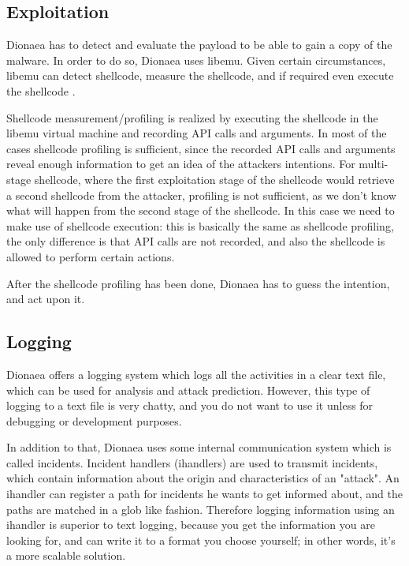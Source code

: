 \documentclass[epsfig,a4paper,11pt,titlepage,oneside,openany]{book}
\begin{document}
\begin{itemize}
\subsection{Exploitation}

Dionaea has to detect and evaluate the payload to be able to gain a copy of the malware. In order to do so, Dionaea uses libemu. Given certain circumstances, libemu can detect shellcode, measure the shellcode, and if required even execute the shellcode \cite{dionaea}.

Shellcode measurement/profiling is realized by executing the shellcode in the libemu virtual machine and recording API calls and arguments. In most of the cases shellcode profiling is sufficient, since the recorded API calls and arguments reveal enough information to get an idea of the attackers intentions. For multi-stage shellcode, where the first exploitation stage of the shellcode would retrieve a second shellcode from the attacker, profiling is not sufficient, as we don’t know what will happen from the second stage of the shellcode. In this case we need to make use of shellcode execution: this is basically the same as shellcode profiling, the only difference is that API calls are not recorded, and also the shellcode is allowed to perform certain actions.

After the shellcode profiling has been done, Dionaea has to guess the intention, and act upon it.

\subsection{Logging}

Dionaea offers a logging system which logs all the activities in a clear text file, which can be used for analysis and attack prediction. However, this type of logging to a text file is very chatty, and you do not want to use it unless for debugging or development purposes.

In addition to that, Dionaea uses some internal communication system which is called incidents. Incident handlers (ihandlers) are used to transmit incidents, which contain information about the origin and characteristics of an "attack". An ihandler can register a path for incidents he wants to get informed about, and  the paths are matched in a glob like fashion. Therefore logging information using an ihandler is superior to text logging, because you get the information you are looking for, and can write it to a format you choose yourself; in other words, it’s a more scalable solution.


\end{itemize}
\end{document}
